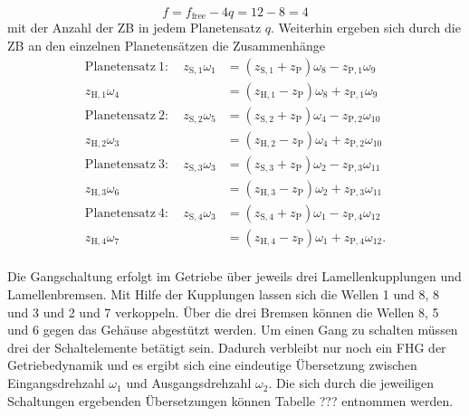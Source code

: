 \begin{equation}
f=f_{\textrm{free}}-4q = 12-8 = 4
\end{equation}
mit der Anzahl der ZB in jedem Planetensatz $q$. Weiterhin ergeben sich durch die ZB an den einzelnen Planetensätzen die Zusammenhänge
\begin{subequations}\label{eq:zwangsbedingungen}
	\begin{align} 
\mathrm{Planetensatz\ 1}: \quad z_{\mathrm{S},1} \omega_{1}  &= (z_{\mathrm{S},1} + z_\mathrm{P}) \omega_{8} - z_{\mathrm{P},1} \omega_{9}\\
z_{\mathrm{H},1} \omega_{4}  &= (z_{\mathrm{H},1} - z_\mathrm{P}) \omega_{8} + z_{\mathrm{P},1} \omega_{9} \\
\mathrm{Planetensatz\ 2}: \quad z_{\mathrm{S},2} \omega_{5}  &= (z_{\mathrm{S},2} + z_\mathrm{P}) \omega_{4} - z_{\mathrm{P},2} \omega_{10} \\
z_{\mathrm{H},2} \omega_{3}  &= (z_{\mathrm{H},2} - z_\mathrm{P}) \omega_{4} + z_{\mathrm{P},2} \omega_{10} \\
\mathrm{Planetensatz\ 3}: \quad z_{\mathrm{S},3} \omega_{3}  &= (z_{\mathrm{S},3} + z_\mathrm{P}) \omega_{2} - z_{\mathrm{P},3} \omega_{11} \\
z_{\mathrm{H},3} \omega_{6}  &= (z_{\mathrm{H},3} - z_\mathrm{P}) \omega_{2} + z_{\mathrm{P},3} \omega_{11} \\
\mathrm{Planetensatz\ 4}: \quad z_{\mathrm{S},4} \omega_{3}  &= (z_{\mathrm{S},4} + z_\mathrm{P}) \omega_{1} - z_{\mathrm{P},4} \omega_{12} \\
z_{\mathrm{H},4} \omega_{7}  &= (z_{\mathrm{H},4} - z_\mathrm{P}) \omega_{1} + z_{\mathrm{P},4} \omega_{12}.
	\end{align}
\end{subequations} 
\\
Die Gangschaltung erfolgt im Getriebe über jeweils drei Lamellenkupplungen und Lamellenbremsen. Mit Hilfe der Kupplungen lassen sich die Wellen 1 und 8, 8 und 3 und 2 und 7 verkoppeln. Über die drei Bremsen können die Wellen 8, 5 und 6 gegen das Gehäuse abgestützt werden. Um einen Gang zu schalten müssen drei der Schaltelemente betätigt sein. Dadurch verbleibt nur noch ein FHG der Getriebedynamik und es ergibt sich eine eindeutige Übersetzung zwischen Eingangsdrehzahl $\omega_{1}$ und Ausgangsdrehzahl $\omega_2$. Die sich durch die jeweiligen Schaltungen ergebenden Übersetzungen können Tabelle ??? entnommen werden.
